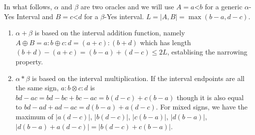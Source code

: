 \documentclass[12pt]{article}
\theoremstyle{remark}
\newcommand{\lt}{\mathord{<}}
\begin{document}
In what follows, $\alpha$ and $\beta$ are two oracles and we will use $A=a\lt b$ for a generic $\alpha$-Yes Interval and $B=c\lt d$ for  a $\beta$-Yes interval.  $L = |A,B| = \max(b-a, d-c)$. 


\begin{enumerate}
    \item $\alpha+\beta$ is based on the interval addition function, namely $A \oplus B = a:b \oplus c:d = (a+c):(b+d)$ which has length $(b+d) - (a+c) = (b-a) + (d-c) \leq 2L$, establising the narrowing property. 
    \item $\alpha * \beta$ is based on the interval multiplication. If the interval endpoints are all the same sign, $a:b \otimes c:d$ is $bd-ac = bd -bc + bc -ac =  b(d-c) + c(b-a)$ though it is also equal to $bd - ad + ad - ac = d(b-a) + a(d-c)$. For mixed signs, we have the maximum of $|a(d-c)|$, $|b(d-c)|$, $|c(b-a)|$, $|d(b-a)|$, $|d(b-a)+a(d-c)| = |b(d-c) + c(b-a)|$. 
    

\end{enumerate}
\end{document}
